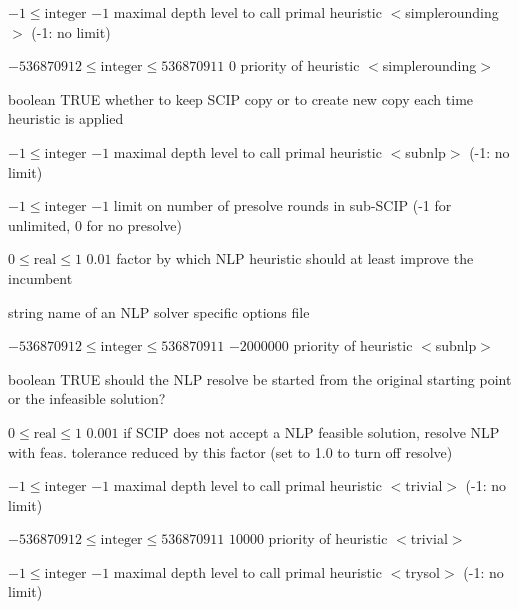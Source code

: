 %
{$-1\leq\textrm{integer}$}%
{$-1$}%
{maximal depth level to call primal heuristic $<$simplerounding$>$ (-1: no limit)}%
{}

%
{$-536870912\leq\textrm{integer}\leq536870911$}%
{$0$}%
{priority of heuristic $<$simplerounding$>$}%
{}

%
{boolean}%
{TRUE}%
{whether to keep SCIP copy or to create new copy each time heuristic is applied}%
{}

%
{$-1\leq\textrm{integer}$}%
{$-1$}%
{maximal depth level to call primal heuristic $<$subnlp$>$ (-1: no limit)}%
{}

%
{$-1\leq\textrm{integer}$}%
{$-1$}%
{limit on number of presolve rounds in sub-SCIP (-1 for unlimited, 0 for no presolve)}%
{}

%
{$0\leq\textrm{real}\leq1$}%
{$0.01$}%
{factor by which NLP heuristic should at least improve the incumbent}%
{}

%
{string}%
{}%
{name of an NLP solver specific options file}%
{}

%
{$-536870912\leq\textrm{integer}\leq536870911$}%
{$-2000000$}%
{priority of heuristic $<$subnlp$>$}%
{}

%
{boolean}%
{TRUE}%
{should the NLP resolve be started from the original starting point or the infeasible solution?}%
{}

%
{$0\leq\textrm{real}\leq1$}%
{$0.001$}%
{if SCIP does not accept a NLP feasible solution, resolve NLP with feas. tolerance reduced by this factor (set to 1.0 to turn off resolve)}%
{}

%
{$-1\leq\textrm{integer}$}%
{$-1$}%
{maximal depth level to call primal heuristic $<$trivial$>$ (-1: no limit)}%
{}

%
{$-536870912\leq\textrm{integer}\leq536870911$}%
{$10000$}%
{priority of heuristic $<$trivial$>$}%
{}

%
{$-1\leq\textrm{integer}$}%
{$-1$}%
{maximal depth level to call primal heuristic $<$trysol$>$ (-1: no limit)}%
{}


